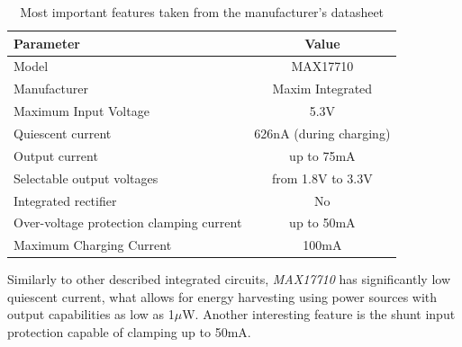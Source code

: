 \documentclass[12pt,a4paper]{article}
\begin{document}
\begin{table}[ht!]
\begin{tabular}{|l|c|}
\hline
\textbf{Parameter}	& \textbf{Value} 	\\ \hline
Model  				& MAX17710       \\ \hline
Manufacturer    	& Maxim Integrated	\\ \hline
Maximum Input Voltage      &  5.3V  \\ \hline
Quiescent current     &  626nA (during charging)\\ \hline
Output current        &  up to 75mA			\\ \hline
Selectable output voltages & from 1.8V to 3.3V\\ \hline
Integrated rectifier 	&  No 		\\ \hline
Over-voltage protection clamping current & up to 50mA \\ \hline
Maximum Charging Current 	&  100mA 	\\ \hline
\end{tabular}
\caption{Most important features taken from the manufacturer's datasheet \cite{max17710_params}}
\label{tab:max17710_params}
\end{table}
\par

Similarly to other described integrated circuits, \textit{MAX17710} has significantly low quiescent current, what allows for energy harvesting using power sources with output capabilities as low as 1$\mu$W. Another interesting feature is the shunt input protection capable of clamping up to 50mA.
\par
\end{document}
